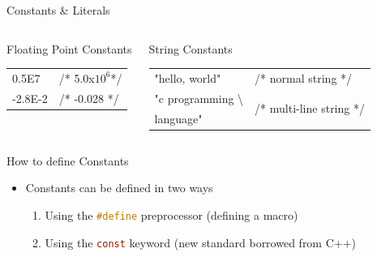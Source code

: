 \documentclass[10pt,t]{beamer}
\begin{document}
\begin{frame}{Constants \& Literals}
{\begin{columns}
\begin{block}{Floating Point Constants}
\begin{tabular}{ll}
          0.5E7     & /* 5.0x$10^6$*/\\
          -2.8E-2   & /* -0.028 */\\
        \end{tabular}
      \end{block}
        \begin{block}{String Constants}
          \begin{tabular}{ll}
            "hello, world"  & /* normal string */\\
            "c programming \textbackslash{} & \multirow{2}{*}{/* multi-line string */}\\
            language" & \\
          \end{tabular}
      \end{block}
    \end{columns}
  }
\end{frame}

\begin{frame}[fragile]{How to define Constants}
  \begin{itemize}
    \item Constants can be defined in two ways
    \begin{enumerate}
      \item Using the \lstinline[language=C,basicstyle=\scriptsize\ttfamily]{#define} preprocessor (defining a macro)
      \item Using the \lstinline[language=C,basicstyle=\scriptsize\ttfamily]{const} keyword (new standard borrowed from C++)
    \end{enumerate}
  \end{itemize}
  
\end{frame}
\end{document}
